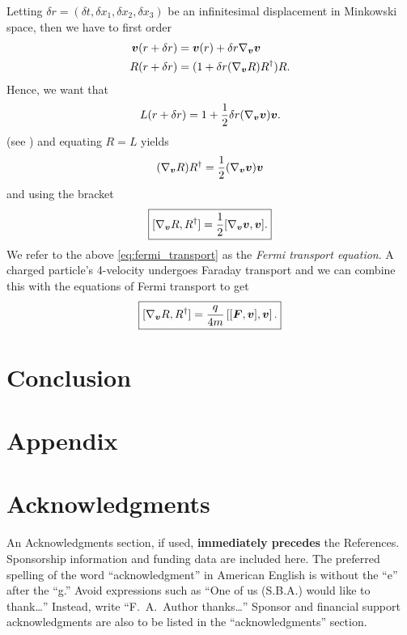 \documentclass[conf]{new-aiaa}
\begin{document}
Letting $\delta r = (\delta t,\delta x_1,\delta x_2, \delta x_3)$ be an infinitesimal displacement in Minkowski space, then we have to first order
\begin{align}
    {\boldsymbol{v}}(r + \delta r) &= {\boldsymbol{v}}(r)+\delta r \nabla_{\boldsymbol{v}} {\boldsymbol{v}}\\
    R(r+\delta r) &= (1+\delta r (\nabla_{\boldsymbol{v}} R) R^\dagger)R.
\end{align}
Hence, we want that
\begin{equation}
    L(r + \delta r) = 1+ \frac{1}{2}\delta r (\nabla_{\boldsymbol{v}} {\boldsymbol{v}}){\boldsymbol{v}}.
\end{equation}
(see \cite{doran_geometric_2003}) and equating $R=L$ yields
\begin{equation}
    (\nabla_{\boldsymbol{v}} R)R^\dagger = \frac{1}{2}(\nabla_{\boldsymbol{v}} {\boldsymbol{v}}){\boldsymbol{v}}
\end{equation}
and using the bracket
\begin{equation}
    \label{eq:fermi_transport}
    \boxed{[\nabla_{\boldsymbol{v}} R, R^\dagger] = \frac{1}{2} [\nabla_{\boldsymbol{v}} {\boldsymbol{v}},{\boldsymbol{v}}].}
\end{equation}
We refer to the above \cref{eq:fermi_transport} as the \emph{Fermi transport equation}. A charged particle's 4-velocity undergoes Faraday transport and we can combine this with the equations of Fermi transport to get
\begin{equation}
    \boxed{[\nabla_{\boldsymbol{v}} R,R^\dagger]= \frac{q}{4m} \left[ [\boldsymbol{F},{\boldsymbol{v}}],{\boldsymbol{v}}\right].}
\end{equation}

\section{Conclusion}



\section*{Appendix}



\section*{Acknowledgments}
An Acknowledgments section, if used, \textbf{immediately precedes} the References. Sponsorship information and funding data are included here. The preferred spelling of the word ``acknowledgment'' in American English is without the ``e'' after the ``g.'' Avoid expressions such as ``One of us (S.B.A.) would like to thank\ldots'' Instead, write ``F.~A.~Author thanks\ldots'' Sponsor and financial support acknowledgments are also to be listed in the ``acknowledgments'' section.


\end{document}
